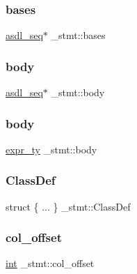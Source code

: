 \mbox{\label{struct__stmt_ade5a7beb8cbe67ccb6fd09c8e674c676}} 
\subsubsection{\texorpdfstring{bases}{bases}}
{\footnotesize\ttfamily \mbox{\hyperlink{structasdl__seq}{asdl\+\_\+seq}}$\ast$ \+\_\+stmt\+::bases}

\mbox{\label{struct__stmt_a3af2e247c98c7a600aa988467119d0da}} 
\subsubsection{\texorpdfstring{body}{body}\hspace{0.1cm}{\footnotesize\ttfamily [1/2]}}
{\footnotesize\ttfamily \mbox{\hyperlink{structasdl__seq}{asdl\+\_\+seq}}$\ast$ \+\_\+stmt\+::body}

\mbox{\label{struct__stmt_ac66b2dfd0e674ec45a9cc1221e68cdc1}} 
\subsubsection{\texorpdfstring{body}{body}\hspace{0.1cm}{\footnotesize\ttfamily [2/2]}}
{\footnotesize\ttfamily \mbox{\hyperlink{_python-ast_8h_a56d3705e020a071405094a220c4592bd}{expr\+\_\+ty}} \+\_\+stmt\+::body}

\mbox{\label{struct__stmt_a5f68581f216f58d243551b8fe9e25b82}} 
\subsubsection{\texorpdfstring{ClassDef}{ClassDef}}
{\footnotesize\ttfamily struct \{ ... \}   \+\_\+stmt\+::\+Class\+Def}

\mbox{\label{struct__stmt_aa2948b6a670a4b66a09dc3eaf022bbf2}} 
\subsubsection{\texorpdfstring{col\_offset}{col\_offset}}
{\footnotesize\ttfamily \mbox{\hyperlink{warnings_8h_a74f207b5aa4ba51c3a2ad59b219a423b}{int}} \+\_\+stmt\+::col\+\_\+offset}

